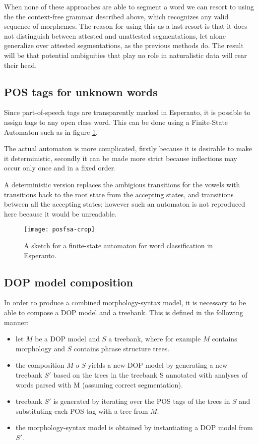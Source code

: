 \documentclass[10pt,a4paper]{article}
\begin{document}
When none of these approaches are able to segment a word we can resort to
using the the context-free grammar described above, which recognizes any valid
sequence of morphemes. The reason for using this as a last resort is that it
does not distinguish between attested and unattested segmentations, let alone
generalize over attested segmentations, as the previous methods do. The result
will be that potential ambiguities that play no role in naturalistic data will
rear their head.

\subsection{POS tags for unknown words}

Since part-of-speech tags are transparently marked in Esperanto, it is
possible to assign tags to any open class word. This can be done using a
Finite-State Automaton such as in figure \ref{posfsa}.

The actual automaton is more complicated, firstly because it is
desirable to make it deterministic, secondly it can be made more strict because
inflections may occur only once and in a fixed order.

A deterministic version replaces the ambigious transitions for the vowels with
transitions back to the root state from the accepting states, and transitions
between all the accepting states; however such an automaton is not reproduced
here because it would be unreadable.

\begin{figure}
\centering
\texttt{[image: posfsa-crop]}
\caption{A sketch for a finite-state automaton for word classification in
Esperanto.}
\label{posfsa}
\end{figure}

\subsection{DOP model composition}

In order to produce a combined morphology-syntax model, it is necessary to be
able to compose a DOP model and a treebank. This is defined in the following
manner:

\begin{itemize}
\item let $M$ be a DOP model and $S$ a treebank, where for example $M$ contains
      morphology and $S$ contains phrase structure trees.
\item the composition $M$ o $S$ yields a new DOP model by generating a new
      treebank $S'$ based on the trees in the treebank S annotated with
      analyses of words parsed with M (assuming correct segmentation).
\item treebank $S'$ is generated by iterating over the POS tags of the trees in
      $S$ and substituting each POS tag with a tree from $M$.
\item the morphology-syntax model is obtained by instantiating a DOP model from
      $S'$.
\end{itemize}
\end{document}
